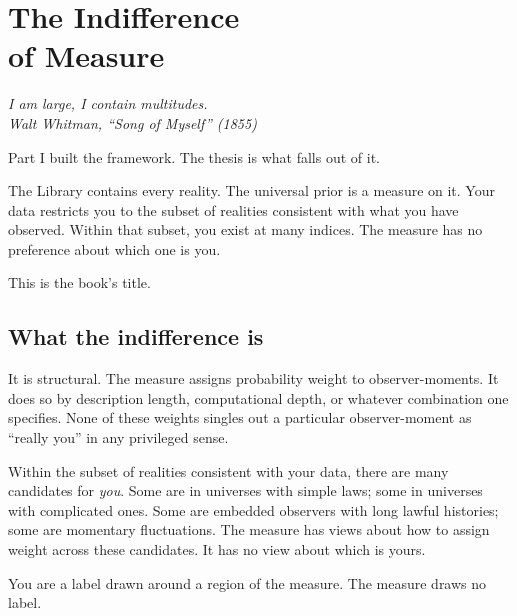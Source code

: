 \chapter[Indifference of Measure]{The Indifference\\of Measure}

\vspace{1em}
\hfill
\begin{minipage}[c]{0.55\textwidth}
\raggedleft
\small\itshape
I am large, I contain multitudes.\\[0.5em]
\upshape\footnotesize Walt Whitman, ``Song of Myself'' (1855)
\end{minipage}%
\hspace{0.5em}
\begin{minipage}[c]{0.12\textwidth}
\end{minipage}
\vspace{1.5em}

\noindent Part I built the framework. The thesis is what falls out of it.

The Library contains every reality. The universal prior is a measure on it. Your data restricts you to the subset of realities consistent with what you have observed. Within that subset, you exist at many indices. The measure has no preference about which one is you.

This is the book's title.

\section*{What the indifference is}

It is structural. The measure assigns probability weight to observer-moments. It does so by description length, computational depth, or whatever combination one specifies. None of these weights singles out a particular observer-moment as ``really you'' in any privileged sense.

Within the subset of realities consistent with your data, there are many candidates for \emph{you}. Some are in universes with simple laws; some in universes with complicated ones. Some are embedded observers with long lawful histories; some are momentary fluctuations. The measure has views about how to assign weight across these candidates. It has no view about which is yours.

You are a label drawn around a region of the measure. The measure draws no label.

